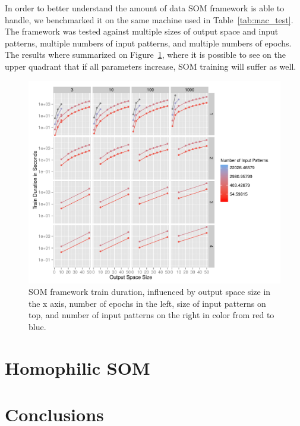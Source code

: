 In order to better understand the amount of data \ac{SOM} framework is able to handle, we benchmarked it on the same machine used in Table~\ref{tab:mac_test}. The framework was tested against multiple sizes of output space and input patterns, multiple numbers of input patterns, and multiple numbers of epochs. 
The results where summarized on Figure~\ref{fig:benchmarkingsom}, where it is possible to see on the upper quadrant that if all parameters increase, \ac{SOM} training will suffer as well.

\begin{figure}[htpb]
  \centering
  \includegraphics[width=0.8\linewidth]{./plots/som/benchmarking.pdf}
  \caption{SOM framework train duration, influenced by output space size in the x axis, number of epochs in the left, size of input patterns on top, and number of input patterns on the right in color from red to blue.}
  \label{fig:benchmarkingsom}
\end{figure}


\section{Homophilic SOM}
\label{sec:homophilic_som}



\section{Conclusions}

\cleardoublepage


